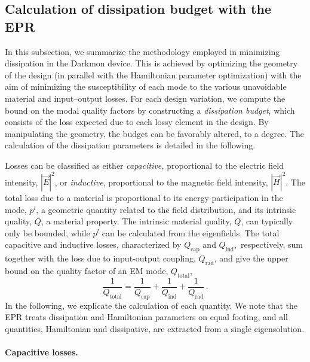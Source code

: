 \subsection{Calculation of dissipation budget with the EPR \label{subsec:Dissipation-budget}}

In this subsection, we summarize the methodology employed in minimizing
dissipation in the Darkmon device. This is achieved by optimizing
the geometry of the design (in parallel with the Hamiltonian parameter
optimization) with the aim of minimizing the susceptibility of each
mode to the various unavoidable material and input–output losses.
For each design variation, we compute the bound on the modal quality
factors by constructing a \emph{dissipation budget}, which consists
of the loss expected due to each lossy element in the design. By manipulating
the geometry, the budget can be favorably altered, to a degree. The
calculation of the dissipation parameters is detailed in the following. 

Losses can be classified as either \emph{capacitive, }proportional
to the electric field intensity, $\left|\vec{E}\right|^{2}$, or \emph{inductive},
proportional to the magnetic field intensity, $\left|\vec{H}\right|^{2}$.
The total loss due to a material is proportional to its energy participation
in the mode, $p^{l}$, a geometric quantity related to the field distribution,
and its intrinsic quality, $Q$, a material property. The intrinsic
material quality, $Q$, can typically only be bounded, while $p^{l}$
can be calculated from the eigenfields. The total capacitive and inductive
losses, characterized by $Q_{\text{cap}}$ and $Q_{\text{ind}},$
respectively, sum together with the loss due to input-output coupling,
$Q_{\mathrm{rad}}$, and give the upper bound on the quality factor
of an EM mode, $Q_{\text{total}}$, \citep{Zmuidzinas2012,Geerlings2013,Reagor2016}
\begin{equation}
\frac{1}{Q_{\text{total}}}=\frac{1}{Q_{\text{cap}}}+\frac{1}{Q_{\text{ind}}}+\frac{1}{Q_{\text{rad}}}\,.
\end{equation}
In the following, we explicate the calculation of each quantity. We
note that the EPR treats dissipation and Hamiltonian parameters on
equal footing, and all quantities, Hamiltonian and dissipative, are
extracted from a single eigensolution. 

\paragraph{Capacitive losses.}


